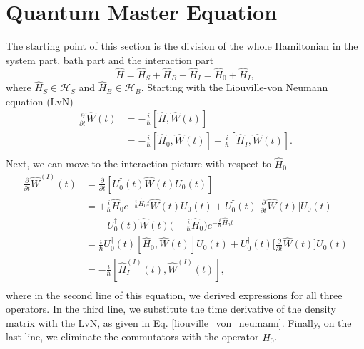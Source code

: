 \section{Quantum Master Equation}
\label{Quantum Master Equation}
The starting point of this section is the division of the whole Hamiltonian in the system part, bath part and the interaction part
\begin{equation}
    \hat{H} = \hat{H}_S + \hat{H}_B + \hat{H}_I = \hat{H}_0 + \hat{H}_I,
\end{equation}
where $\hat{H}_S \in \mathcal{H}_S$ and $\hat{H}_B \in \mathcal{H}_B$. Starting with the Liouville-von Neumann equation (LvN)
\begin{equation}
\label{liouville_von_neumann}
    \begin{aligned}
    \frac{\partial}{\partial t}\hat{W}(t) &= -\frac{i}{\hbar}[ \hat{H}, \hat{W}(t) ] \\
    &= -\frac{i}{\hbar}[ \hat{H}_0, \hat{W}(t) ] -\frac{i}{\hbar}[ \hat{H}_I, \hat{W}(t) ]. \\
    \end{aligned}
\end{equation}
Next, we can move to the interaction picture with respect to $\hat{H}_0$
\begin{equation}
\label{liouville_von_neumann_int}
    \begin{aligned}
    \frac{\partial}{\partial t}\hat{W}^{(I)}(t) &= \frac{\partial}{\partial t} [U^\dagger_0(t) \hat{W}(t)U_0(t)] \\
    &=+\frac{i}{\hbar} \hat{H}_0 e^{+\frac{i}{\hbar}\hat{H}_0 t} \hat{W}(t) U_0(t) + U^\dagger_0(t)  \Big[\frac{\partial}{\partial t}\hat{W}(t) \Big]U_0(t) \\
    &\quad+ U^\dagger_0(t) \hat{W}(t) \Big(-\frac{i}{\hbar} \hat{H}_0 \Big)e^{-\frac{i}{\hbar}\hat{H}_0 t}\\
    &= \frac{i}{\hbar}U^\dagger_0(t) [ \hat{H}_0, \hat{W}(t) ]U_0(t) + U^\dagger_0(t) \Big[\frac{\partial}{\partial t}\hat{W}(t) \Big]U_0(t) \\
    &= -\frac{i}{\hbar} [ \hat{H}_I^{(I)}(t), \hat{W}^{(I)}(t) ], \\
    \end{aligned}
\end{equation}
where in the second line of this equation, we derived expressions for all three operators. In the third line, we substitute the time derivative of the density matrix with the LvN, as given in Eq. \ref{liouville_von_neumann}. Finally, on the last line, we eliminate the commutators with the operator $\hat{H}_0$.

